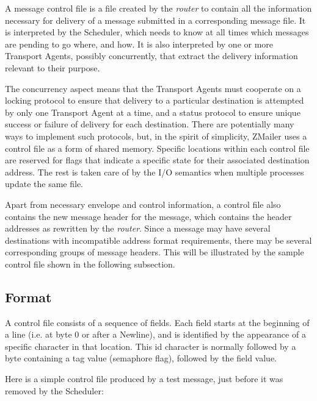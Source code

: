 A message control file is a file created by the {\em router} to contain all the
information necessary for delivery of a message submitted in a
corresponding message file.  It is interpreted by the Scheduler, which
needs to know at all times which messages are pending to go where, and how.
It is also interpreted by one or more Transport Agents, possibly
concurrently, that extract the delivery information relevant to their
purpose.

The concurrency aspect means that the Transport Agents must cooperate on a
locking protocol to ensure that delivery to a particular destination is
attempted by only one Transport Agent at a time, and a status protocol to
ensure unique success or failure of delivery for each destination.  There
are potentially many ways to implement such protocols, but, in the spirit
of simplicity, ZMailer uses a control file as a form of shared memory.
Specific locations within each control file are reserved for flags that
indicate a specific state for their associated destination address.  The
rest is taken care of by the I/O semantics when multiple processes update
the same file.

Apart from necessary envelope and control information, a control file also
contains the new message header for the message, which contains the header
addresses as rewritten by the {\em router}.  Since a message may have several
destinations with incompatible address format requirements, there may be
several corresponding groups of message headers.  This will be illustrated
by the sample control file shown in the following subsection.




\subsection{Format}

A control file consists of a sequence of fields.  Each field starts at the
beginning of a line (i.e. at byte 0 or after a Newline), and is identified
by the appearance of a specific character in that location.  This id
character is normally followed by a byte containing a tag value (semaphore
flag), followed by the field value.

Here is a simple control file produced by a test message, just before it
was removed by the Scheduler:

